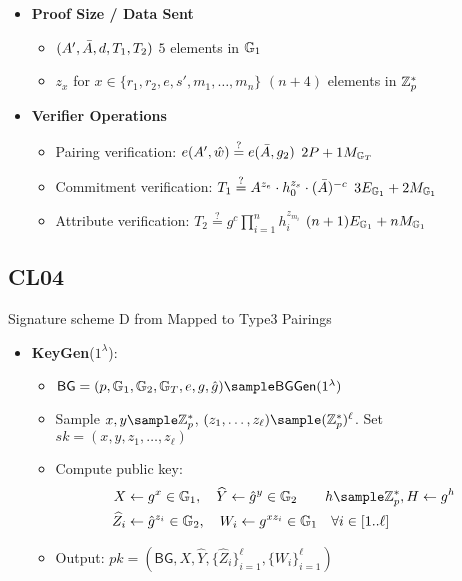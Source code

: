 {\begin{itemize}
    \item \textbf{Proof Size / Data Sent}
    \begin{itemize}
        \item $(A', \Bar{A}, d, T_1, T_2)$ \qquad $5$ elements in $\mathbb{G}_1$
        \item $z_x$ for $x \in \{r_1, r_2, e, s', m_1,\ldots,m_n\}$ \qquad $(n+4)$ elements in $\mathbb{Z}_p^*$
    \end{itemize}
    
    \item \textbf{Verifier Operations}
    \begin{itemize}
        \item Pairing verification: $e(A',\hat{w}) \stackrel{?}{=} e(\Bar{A},g_2)$ \qquad $2P + 1M_{\mathbb{G}_T}$
        \item Commitment verification: $T_1 \stackrel{?}{=} A^{z_e} \cdot h_0^{z_s} \cdot (\Bar{A})^{-c}$ \qquad $3E_{\mathbb{G}_1} + 2M_{\mathbb{G}_1}$
        \item Attribute verification: $T_2 \stackrel{?}{=} g^c\prod_{i=1}^n h_i^{z_{m_i}}$ \qquad $(n+1)E_{\mathbb{G}_1} + nM_{\mathbb{G}_1}$
    \end{itemize}
\end{itemize}




% 
% 

\newpage
\subsection{CL04 \cite{hutchison_signature_2004}}
Signature scheme D from \cite{hutchison_signature_2004} Mapped to Type3 Pairings

\begin{itemize}
    \item \textbf{KeyGen}($1^\lambda$):
    \begin{itemize}
        \item $\mathsf{BG} = (p, \G_1, \G_2, \G_T, e, g, \hat{g}) \sample \mathsf{BGGen}(1^\lambda)$
        \item Sample $x, y \sample \Z_p^*$, $(z_1, \ldots, z_\ell) \sample (\Z_p^*)^\ell$. Set $sk = (x, y, z_1, \ldots, z_\ell)$
        \item Compute public key:
            \begin{align*}
                X &\gets g^x \in \G_1, \quad \widehat{Y} \gets \hat{g}^y \in \G_2 \qquad h \sample \Z_p^*, H \gets g^h\\
                \widehat{Z}_i &\gets \hat{g}^{z_i} \in \G_2, \quad W_i \gets g^{x z_i} \in \G_1 \quad \forall i \in [1..\ell]
            \end{align*}
        \item Output: $pk = (\mathsf{BG}, X, \widehat{Y}, \{\widehat{Z}_i\}_{i=1}^\ell, \{W_i\}_{i=1}^\ell)$
    \end{itemize}
    

\end{itemize}}
